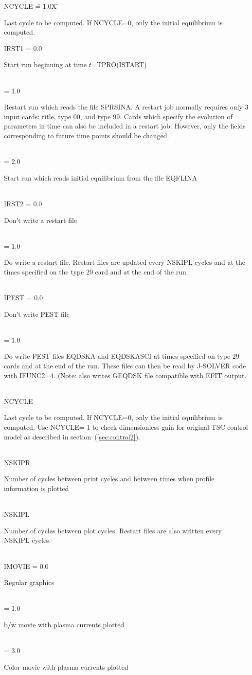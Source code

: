 \begin{tabbing} 
NCYCLE \= = 1.0X \= \parbox[t]{\width}{Last cycle to be computed.  If NCYCLE=0, only the
initial equilibrium is computed.} \kill 
IRST1 \> = 0.0 \> \parbox[t]{\width}{ Start run beginning at time $t$=TPRO(ISTART)} \\ 
          \> = 1.0 \> \parbox[t]{\width}{ Restart run which reads the file SPRSINA.  A restart job
normally requires only 3 input cards: title, type 00, and type 99.  Cards which specify the evolution
of parameters in time can also be included in a restart job.  However, only the fields corresponding to 
future time points should be changed.} \\ 
          \> = 2.0 \> \parbox[t]{\width}{ Start run which reads initial equilibrium from the file
EQFLINA} \\ 
IRST2 \> = 0.0 \> \parbox[t]{\width}{ Don't write a restart file} \\ 
          \> = 1.0 \> \parbox[t]{\width}{ Do write a restart file.  Restart files are updated every NSKIPL cycles
and at the times specified on the type 29 card and at the end of the run.} \\ 
IPEST \> = 0.0 \> \parbox[t]{\width}{ Don't write PEST file} \\    
           \> = 1.0 \> \parbox[t]{\width}{ Do write PEST files EQDSKA and EQDSKASCI at times specified on type
29 cards and at the end of the run. These files can then be read by J-SOLVER code with
IFUNC2=4. (Note:  also writes GEQDSK file compatible with EFIT output.} \\ 
NCYCLE \>      \> \parbox[t]{\width}{ Last cycle to be computed.  If NCYCLE=0, only the
initial equilibrium is computed. Use NCYCLE=-1 to check dimensionless gain for original TSC
control model as described in section~(\ref{sec:control2}).}\\
NSKIPR \>      \> \parbox[t]{\width}{ Number of cycles between print cycles and between times when profile
information is plotted} \\ 
NSKIPL \>      \> \parbox[t]{\width}{ Number of cycles between plot cycles.  Restart files are also written
every NSKIPL cycles.} \\ 
IMOVIE \> = 0.0 \> \parbox[t]{\width}{ Regular graphics} \\
             \> = 1.0 \> \parbox[t]{\width}{ b/w movie with plasma currents plotted} \\ 
             \>  = 3.0 \> \parbox[t]{\width}{ Color movie with plasma currents plotted} \\ 

\end{tabbing}
